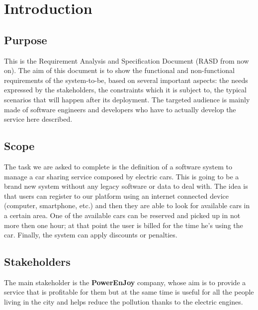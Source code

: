 \section{Introduction}

\subsection{Purpose}
    This is the Requirement Analysis and Specification Document (RASD from now on).
    The aim of this document is to show the functional and non-functional requirements
    of the system-to-be, based on several important aspects:
    the needs expressed by the stakeholders, the constraints which it is subject to,
    the typical scenarios that will happen after its deployment.
    The targeted audience is mainly made of software engineers and developers who have
    to actually develop the service here described.

\subsection{Scope}
    The task we are asked to complete is the definition of a software system to manage a car sharing
    service composed by electric cars. This is going to be a brand new system without any
    legacy software or data to deal with. The idea is that users can register to our platform
    using an internet connected device (computer, smartphone, etc.) and then they are able to
    look for available cars in a certain area. 
    One of the available cars can be reserved and picked up in not more then one hour; at that
    point the user is billed for the time he's using the car.
    Finally, the system can apply discounts or penalties.

\subsection{Stakeholders}
    The main stakeholder is the \textbf{PowerEnJoy} company, whose aim is to provide a service
    that is profitable for them but at the same time is useful for all the people living in the
    city and helps reduce the pollution thanks to the electric engines.

